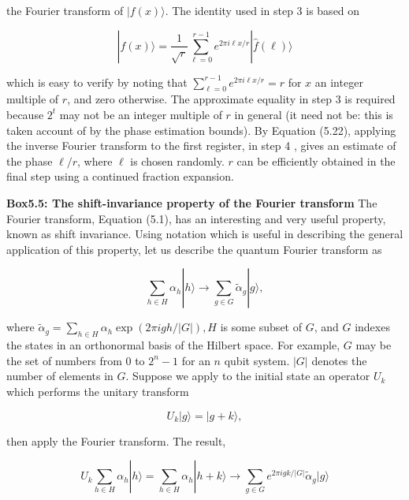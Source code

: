 the Fourier transform of $|f(x)\rangle$. The identity used in step 3 is based on

\begin{equation*}
|f(x)\rangle=\frac{1}{\sqrt{r}} \sum_{\ell=0}^{r-1} e^{2 \pi i \ell x / r}|\hat{f}(\ell)\rangle \tag{5.64}
\end{equation*}

which is easy to verify by noting that $\sum_{\ell=0}^{r-1} e^{2 \pi i \ell x / r}=r$ for $x$ an integer multiple of $r$, and zero otherwise. The approximate equality in step 3 is required because $2^{t}$ may not be an integer multiple of $r$ in general (it need not be: this is taken account of by the phase estimation bounds). By Equation (5.22), applying the inverse Fourier transform to the first register, in step 4 , gives an estimate of the phase $\ell / r$, where $\ell$ is chosen randomly. $r$ can be efficiently obtained in the final step using a continued fraction expansion.

\textbf{Box5.5: The shift-invariance property of the Fourier transform}
The Fourier transform, Equation (5.1), has an interesting and very useful property, known as shift invariance. Using notation which is useful in describing the general application of this property, let us describe the quantum Fourier transform as

\begin{equation*}
\sum_{h \in H} \alpha_{h}|h\rangle \rightarrow \sum_{g \in G} \tilde{\alpha}_{g}|g\rangle, \tag{5.65}
\end{equation*}

where $\tilde{\alpha}_{g}=\sum_{h \in H} \alpha_{h} \exp (2 \pi i g h /|G|), H$ is some subset of $G$, and $G$ indexes the states in an orthonormal basis of the Hilbert space. For example, $G$ may be the set of numbers from 0 to $2^{n}-1$ for an $n$ qubit system. $|G|$ denotes the number of elements in $G$. Suppose we apply to the initial state an operator $U_{k}$ which performs the unitary transform

\begin{equation*}
U_{k}|g\rangle=|g+k\rangle, \tag{5.66}
\end{equation*}

then apply the Fourier transform. The result,

\begin{equation*}
U_{k} \sum_{h \in H} \alpha_{h}|h\rangle=\sum_{h \in H} \alpha_{h}|h+k\rangle \rightarrow \sum_{g \in G} e^{2 \pi i g k /|G|} \tilde{\alpha}_{g}|g\rangle \tag{5.67}
\end{equation*}

